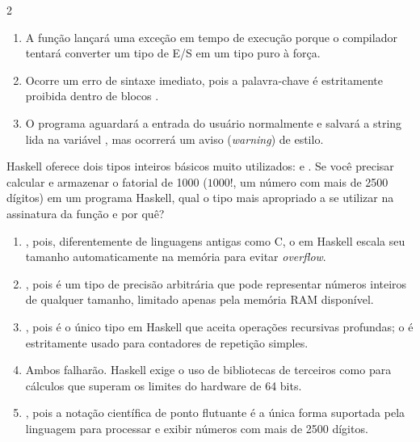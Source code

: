\documentclass[a4paper,10pt,brazil]{article}
\begin{document}
\begin{multicols}{2}
\begin{enumerate}
  \item A função  lançará uma exceção em tempo de execução porque o compilador tentará converter um tipo de E/S em um tipo puro à força.

  \item Ocorre um erro de sintaxe imediato, pois a palavra-chave  é estritamente proibida dentro de blocos .

  \item O programa aguardará a entrada do usuário normalmente e salvará a string lida na variável , mas ocorrerá um aviso (\emph{warning}) de estilo.


\end{enumerate}

Haskell oferece dois tipos inteiros básicos muito utilizados:  e . Se você precisar calcular e armazenar o fatorial de 1000 ($1000!$, um número com mais de 2500 dígitos) em um programa Haskell, qual o tipo mais apropriado a se utilizar na assinatura da função e por quê?

\begin{enumerate}
  \item {}, pois, diferentemente de linguagens antigas como C, o  em Haskell escala seu tamanho automaticamente na memória para evitar \emph{overflow}.

  \item {}, pois é um tipo de precisão arbitrária que pode representar números inteiros de qualquer tamanho, limitado apenas pela memória RAM disponível.

  \item {}, pois é o único tipo em Haskell que aceita operações recursivas profundas; o  é estritamente usado para contadores de repetição simples.

  \item Ambos falharão. Haskell exige o uso de bibliotecas de terceiros como  para cálculos que superam os limites do hardware de 64 bits.

  \item {}, pois a notação científica de ponto flutuante é a única forma suportada pela linguagem para processar e exibir números com mais de 2500 dígitos.


\end{enumerate}


\end{multicols}
\end{document}
